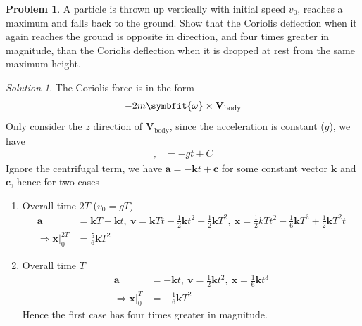\documentclass[twoside,11pt]{article}
\newcommand{\lms}{\fontfamily{lmss}\selectfont} %
\theoremstyle{definition}
\newtheorem{problem}{\lms Problem}
\theoremstyle{remark}
\newtheorem*{solution}{Solution}
\begin{document}
\begin{problem}
A particle is thrown up vertically with initial speed $v_0$, reaches a maximum
and falls back to the ground. Show that the Coriolis deflection when it again 
reaches the ground is opposite in direction, and four times greater in magnitude,
than the Coriolis deflection when it is dropped at rest from the same maximum
height.
\end{problem}
\begin{solution} 
The Coriolis force is in the form 
\begin{align*}
    -2m\symbfit{\omega}\times\mathbf{V}_\text{body}
\end{align*}
Only consider the $z$ direction of $\mathbf{V}_\text{body}$, since the 
acceleration is constant ($g$), we have 
\begin{align*}
    [\mathbf{V}_\text{body}]_z &= -gt + C
\end{align*}
Ignore the centrifugal term, we have $\mathbf{a}=-\mathbf{k}t+\mathbf{c}$
for some constant vector $\mathbf{k}$ and $\mathbf{c}$, hence for two cases
\begin{enumerate}[label=\roman*.]
\item Overall time $2T$ ($v_0 = gT$)
\begin{align*}
    \mathbf{a} &= \mathbf{k}T - \mathbf{k}t,~
    \mathbf{v} = \mathbf{k}Tt - \frac{1}{2}\mathbf{k}t^2 + \frac{1}{2}\mathbf k T^2,~
    \mathbf{x} = \frac{1}{2}kTt^2 - \frac{1}{6}\mathbf{k}T^3 + \frac{1}{2} \mathbf kT^2 t\\
    \Rightarrow \left. \mathbf{x}\right|_0^{2T} &= 
    \frac{5}{6}\mathbf k T^2
\end{align*}

\item Overall time $T$
\begin{align*}
    \mathbf{a} &= -\mathbf k t,~
    \mathbf{v} = \frac{1}{2}\mathbf{k}t^2,~
    \mathbf{x} = \frac{1}{6}\mathbf{k}t^3\\
    \Rightarrow \left. \mathbf{x}\right|_0^{T} &= 
    -\frac{1}{6}\mathbf k T^2
\end{align*}
Hence the first case has four times greater in magnitude.

\end{enumerate}
\end{solution}
\end{document}
